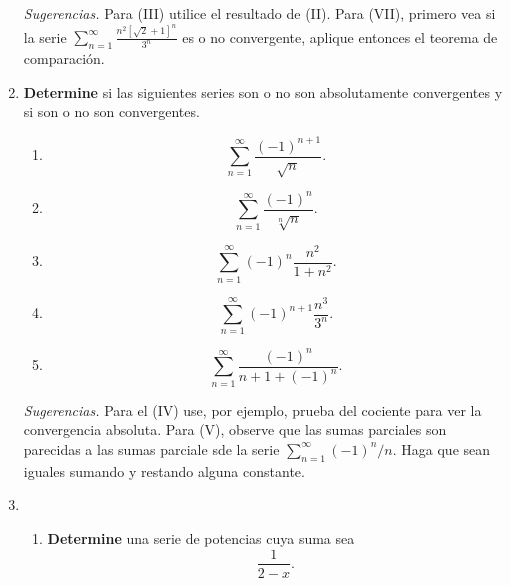\documentclass[12pt]{article}
\begin{document}
\begin{enumerate}
\begin{multicols}{2}
    \end{multicols}
    \textit{Sugerencias.} Para (III) utilice el resultado de (II). Para (VII), primero vea si la serie $\sum_{n=1}^{\infty}\frac{n^2\left[\sqrt{2}+1\right]^n}{3^n}$ es o no convergente, aplique entonces el teorema de comparación.
    \item \textbf{Determine} si las siguientes series son o no son absolutamente convergentes y si son o no son convergentes.
    \begin{multicols}{2}
        \begin{enumerate}
            \item \begin{equation*}
                \sum_{n=1}^{\infty}\frac{(-1)^{n+1}}{\sqrt{n}}.
            \end{equation*}
            \item \begin{equation*}
                \sum_{n=1}^{\infty}\frac{(-1)^n}{\sqrt[n]{n}}.
            \end{equation*}
            \item \begin{equation*}
                \sum_{n=1}^{\infty}(-1)^n\frac{n^2}{1+n^2}.
            \end{equation*}
            \item \begin{equation*}
                \sum_{n=1}^{\infty}(-1)^{n+1}\frac{n^3}{3^n}.
            \end{equation*}
            \item \begin{equation*}
                \sum_{n=1}^{\infty}\frac{(-1)^n}{n+1+(-1)^n}.
            \end{equation*}
        \end{enumerate}
    \end{multicols}
    \textit{Sugerencias.} Para el (IV) use, por ejemplo, prueba del cociente para ver la convergencia absoluta. Para (V), observe que las sumas parciales son parecidas a las sumas parciale sde la serie $\sum_{n=1}^{\infty}(-1)^n/n$. Haga que sean iguales sumando y restando alguna constante.
    \item \begin{enumerate}
        \item \textbf{Determine} una serie de potencias cuya suma sea
        \begin{equation*}
            \frac{1}{2-x}.
        \end{equation*}

\end{enumerate}
\end{enumerate}
\end{document}
